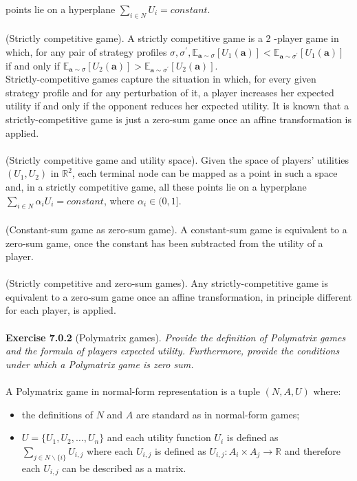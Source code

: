 points lie on a hyperplane $ \sum_{i \in N} U_{i} = constant $.\\\\
(Strictly competitive game). A strictly competitive game is a 2 -player game in which, for any pair of strategy profiles $ \sigma, \sigma^{\prime}, \mathbb{E}_{\mathbf{a} \sim \sigma} [ U_{1}(\mathbf{a}) ] < \mathbb{E}_{\mathbf{a} \sim \sigma^{\prime}} [ U_{1}(\mathbf{a}) ] $ if and only if $ \mathbb{E}_{\mathbf{a} \sim \sigma} [ U_{2}(\mathbf{a}) ] > \mathbb{E}_{\mathbf{a} \sim \sigma^{\prime}} [ U_{2}(\mathbf{a}) ] $.\\
Strictly-competitive games capture the situation in which, for every given strategy profile and for any perturbation of it, a player increases her expected utility if and only if the opponent reduces her expected utility. It is known that a strictly-competitive game is just a zero-sum game once an affine transformation is applied.\\\\
(Strictly competitive game and utility space). Given the space of players’ utilities $ (U_1,U_2) $ in $ \mathbb{R}^2 $, each terminal node can be mapped as a point in such a space and, in a strictly competitive game, all these points lie on a hyperplane $ \sum_{i \in N} \alpha_{i} U_{i} = constant $, where $ \alpha_{i} \in (0, 1] $.\\\\
(Constant-sum game as zero-sum game). A constant-sum game is equivalent to a zero-sum game, once the constant has been subtracted from the utility of a player.\\\\
(Strictly competitive and zero-sum games). Any strictly-competitive game is equivalent to a zero-sum game once an affine transformation, in principle different for each player, is applied.\\\\
\textbf{Exercise 7.0.2} (Polymatrix games). \textit{Provide the definition of Polymatrix games and the formula of players expected utility. Furthermore, provide the conditions under which a Polymatrix game is zero sum.}\\\\
A Polymatrix game in normal-form representation is a tuple $ (N, A, U) $ where:
\begin{itemize}
\item the definitions of $ N $ and $ A $ are standard as in normal-form games;
\item $ U = \{ U_{1}, U_{2}, \ldots, U_{n} \} $ and each utility function $ U_{i} $ is defined as\\
$ \sum_{j \in N \backslash\{i\}} U_{i, j} $ where each $ U_{i, j} $ is defined as $ U_{i, j}: A_{i} \times A_{j} \rightarrow \mathbb{R} $ and therefore each $ U_{i, j} $ can be described as a matrix.
\end{itemize}
